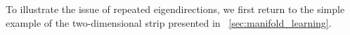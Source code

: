 
To illustrate the issue of repeated eigendirections, we first return to the simple example of the two-dimensional strip presented in \sec~\ref{sec:manifold_learning}.
%
%
%
%
